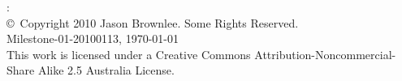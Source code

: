 



\begin{flushleft}
%
\mybooktitle: \mybooksubtitle \\
\copyright\ Copyright 2010 Jason Brownlee. Some Rights Reserved. \\
\small{
Milestone-01-20100113, \today \\
This work is licensed under a Creative Commons Attribution-Noncommercial-Share Alike 2.5 Australia License.
}
%
\end{flushleft}

\hfill


	
\vfill\vfill\vfill